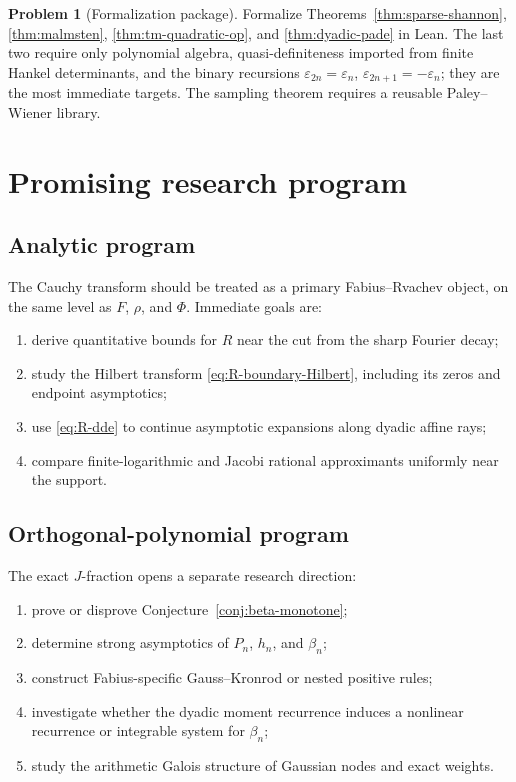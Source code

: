 \documentclass[11pt]{article}
\theoremstyle{definition}
\newtheorem{problem}[theorem]{Problem}
\theoremstyle{remark}
\newcommand{\eps}{\varepsilon}
\begin{document}
\begin{problem}[Formalization package]
Formalize Theorems~\ref{thm:sparse-shannon}, \ref{thm:malmsten},
\ref{thm:tm-quadratic-op}, and \ref{thm:dyadic-pade} in Lean.  The last two require only
polynomial algebra, quasi-definiteness imported from finite Hankel determinants, and the
binary recursions \(\eps_{2n}=\eps_n\), \(\eps_{2n+1}=-\eps_n\); they are the most
immediate targets.  The sampling theorem requires a reusable Paley--Wiener library.
\end{problem}

\section{Promising research program}

\subsection{Analytic program}

The Cauchy transform should be treated as a primary Fabius--Rvachev object, on the same
level as \(F\), \(\rho\), and \(\Phi\).  Immediate goals are:

\begin{enumerate}
\item derive quantitative bounds for \(R\) near the cut from the sharp Fourier decay;
\item study the Hilbert transform \eqref{eq:R-boundary-Hilbert}, including its zeros and
      endpoint asymptotics;
\item use \eqref{eq:R-dde} to continue asymptotic expansions along dyadic affine rays;
\item compare finite-logarithmic and Jacobi rational approximants uniformly near the
      support.
\end{enumerate}

\subsection{Orthogonal-polynomial program}

The exact \(J\)-fraction opens a separate research direction:

\begin{enumerate}
\item prove or disprove Conjecture~\ref{conj:beta-monotone};
\item determine strong asymptotics of \(P_n\), \(h_n\), and \(\beta_n\);
\item construct Fabius-specific Gauss--Kronrod or nested positive rules;
\item investigate whether the dyadic moment recurrence induces a nonlinear recurrence or
      integrable system for \(\beta_n\);
\item study the arithmetic Galois structure of Gaussian nodes and exact weights.
\end{enumerate}
\end{document}
